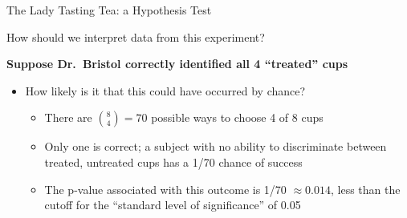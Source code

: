 \documentclass[10pt,xcolor=table,ignorenonframetext,handout,aspectratio=169]{beamer}
\newlength{\wideitemsep}
\let\olditem\item
\renewcommand{\item}{\setlength{\itemsep}{\wideitemsep}\olditem}
\begin{document}
\begin{frame}{The Lady Tasting Tea:  a Hypothesis Test}

\medskip
How should we interpret data from this experiment?

\pause
\medskip
\medskip
\textbf{Suppose Dr.~Bristol correctly identified all 4 ``treated'' cups}

\medskip
\begin{itemize}
	
	\item How likely is it that this could have occurred by chance?
	
	\medskip
	\begin{itemize}
		
		\item There are ${8 \choose 4} = 70$ possible ways to choose 4 of 8 cups
		
		\item Only one is correct; a subject with no ability to discriminate between treated, untreated cups has a 1/70 chance of success
		
		\item The p-value associated with this outcome is 1/70 $\approx 0.014$, less than the cutoff for the ``standard level of significance'' of 0.05
		
	\end{itemize}
	
\end{itemize}

\end{frame}

\end{document}
